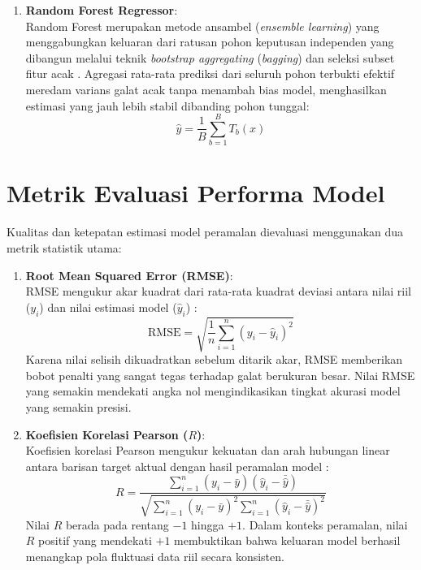 \documentclass[a4paper,oneside,12pt]{report}
\begin{document}
\begin{enumerate}
    \item \textbf{Random Forest Regressor}: \\
    Random Forest merupakan metode ansambel (\textit{ensemble learning}) yang menggabungkan keluaran dari ratusan pohon keputusan independen yang dibangun melalui teknik \textit{bootstrap aggregating} (\textit{bagging}) dan seleksi subset fitur acak \cite{ref_pedregosa}. Agregasi rata-rata prediksi dari seluruh pohon terbukti efektif meredam varians galat acak tanpa menambah bias model, menghasilkan estimasi yang jauh lebih stabil dibanding pohon tunggal:
    \begin{equation}
        \hat{y} = \frac{1}{B}\sum_{b=1}^B T_b(x)
    \end{equation}
\end{enumerate}

\section{Metrik Evaluasi Performa Model}
Kualitas dan ketepatan estimasi model peramalan dievaluasi menggunakan dua metrik statistik utama:

\begin{enumerate}
    \item \textbf{Root Mean Squared Error (RMSE)}: \\
    RMSE mengukur akar kuadrat dari rata-rata kuadrat deviasi antara nilai riil ($y_i$) dan nilai estimasi model ($\hat{y}_i$) \cite{ref_chai}:
    \begin{equation}
        \text{RMSE} = \sqrt{\frac{1}{n}\sum_{i=1}^n (y_i - \hat{y}_i)^2}
    \end{equation}
    Karena nilai selisih dikuadratkan sebelum ditarik akar, RMSE memberikan bobot penalti yang sangat tegas terhadap galat berukuran besar. Nilai RMSE yang semakin mendekati angka nol mengindikasikan tingkat akurasi model yang semakin presisi.

    \item \textbf{Koefisien Korelasi Pearson ($R$)}: \\
    Koefisien korelasi Pearson mengukur kekuatan dan arah hubungan linear antara barisan target aktual dengan hasil peramalan model \cite{ref_benesty}:
    \begin{equation}
        R = \frac{\sum_{i=1}^n (y_i - \bar{y})(\hat{y}_i - \bar{\hat{y}})}{\sqrt{\sum_{i=1}^n (y_i - \bar{y})^2 \sum_{i=1}^n (\hat{y}_i - \bar{\hat{y}})^2}}
    \end{equation}
    Nilai $R$ berada pada rentang $-1$ hingga $+1$. Dalam konteks peramalan, nilai $R$ positif yang mendekati $+1$ membuktikan bahwa keluaran model berhasil menangkap pola fluktuasi data riil secara konsisten.
\end{enumerate}
\clearpage
\end{document}
